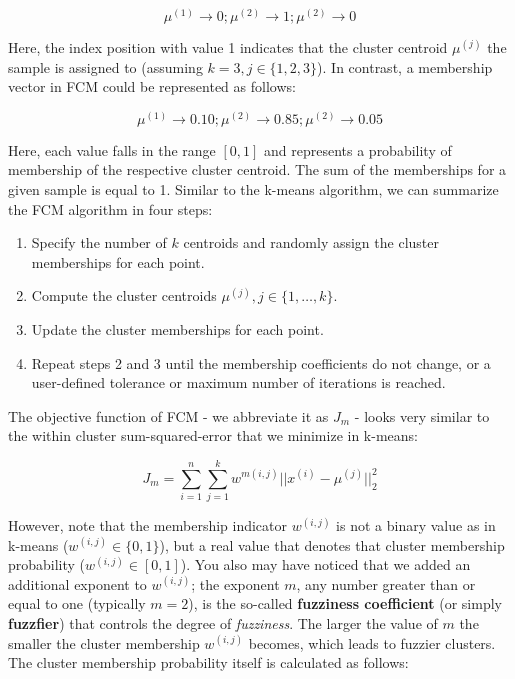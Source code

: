 \documentclass[11pt]{article}
\providecommand{\tightlist}{%
      \setlength{\itemsep}{0pt}\setlength{\parskip}{0pt}}
\begin{document}
\[\mu^{(1)} \rightarrow 0; \mu^{(2)} \rightarrow 1; \mu^{(2)} \rightarrow 0\]

Here, the index position with value 1 indicates that the cluster
centroid \(\mu^{(j)}\) the sample is assigned to (assuming
\(k=3, j \in \{1, 2, 3\}\)). In contrast, a membership vector in FCM
could be represented as follows:

\[\mu^{(1)} \rightarrow 0.10; \mu^{(2)} \rightarrow 0.85; \mu^{(2)} \rightarrow 0.05\]

Here, each value falls in the range \([0, 1]\) and represents a
probability of membership of the respective cluster centroid. The sum of
the memberships for a given sample is equal to 1. Similar to the k-means
algorithm, we can summarize the FCM algorithm in four steps:

\begin{enumerate}
\def\labelenumi{\arabic{enumi}.}
\tightlist
\item
  Specify the number of \(k\) centroids and randomly assign the cluster
  memberships for each point.
\item
  Compute the cluster centroids \(\mu^{(j)}, j \in \{1, \ldots, k\}\).
\item
  Update the cluster memberships for each point.
\item
  Repeat steps 2 and 3 until the membership coefficients do not change,
  or a user-defined tolerance or maximum number of iterations is
  reached.
\end{enumerate}

The objective function of FCM - we abbreviate it as \(J_m\) - looks very
similar to the within cluster sum-squared-error that we minimize in
k-means:

\[J_m = \sum_{i=1}^n\sum_{j=1}^k w^{m(i, j)} ||x^{(i)} - \mu^{(j)}||_2^2\]

However, note that the membership indicator \(w^{(i, j)}\) is not a
binary value as in k-means (\(w^{(i, j)} \in \{0, 1\}\)), but a real
value that denotes that cluster membership probability
(\(w^{(i, j)} \in [0, 1]\)). You also may have noticed that we added an
additional exponent to \(w^{(i, j)}\); the exponent \(m\), any number
greater than or equal to one (typically \(m=2\)), is the so-called
\textbf{fuzziness coefficient} (or simply \textbf{fuzzfier}) that
controls the degree of \emph{fuzziness}. The larger the value of \(m\)
the smaller the cluster membership \(w^{(i, j)}\) becomes, which leads
to fuzzier clusters. The cluster membership probability itself is
calculated as follows:
\end{document}
